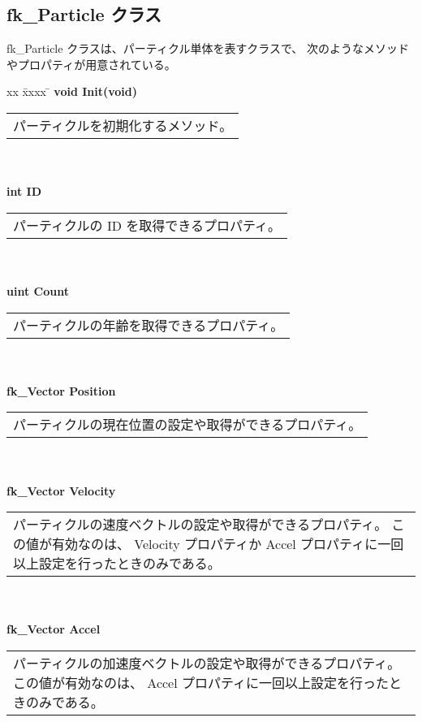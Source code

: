 \subsection{fk\_Particle クラス}
fk\_Particle クラスは、パーティクル単体を表すクラスで、
次のようなメソッドやプロパティが用意されている。
\begin{tabbing}
xx \= xxxx \= \kill
\> \textbf{void Init(void)} \\
	\> \> \begin{tabular}{p{15cm}}
		パーティクルを初期化するメソッド。
	\end{tabular} \\ \\

\> \textbf{int ID} \\
	\> \> \begin{tabular}{p{15cm}}
		パーティクルの ID を取得できるプロパティ。
	\end{tabular} \\ \\

\> \textbf{uint Count} \\
	\> \> \begin{tabular}{p{15cm}}
		パーティクルの年齢を取得できるプロパティ。
	\end{tabular} \\ \\

\> \textbf{fk\_Vector Position} \\
	\> \> \begin{tabular}{p{15cm}}
		パーティクルの現在位置の設定や取得ができるプロパティ。
	\end{tabular} \\ \\

\> \textbf{fk\_Vector Velocity} \\
	\> \> \begin{tabular}{p{15cm}}
		パーティクルの速度ベクトルの設定や取得ができるプロパティ。
		この値が有効なのは、
		Velocity プロパティか Accel プロパティに一回以上設定を行ったときのみである。
	\end{tabular} \\ \\

\> \textbf{fk\_Vector Accel} \\
	\> \> \begin{tabular}{p{15cm}}
		パーティクルの加速度ベクトルの設定や取得ができるプロパティ。
		この値が有効なのは、
		Accel プロパティに一回以上設定を行ったときのみである。
	\end{tabular} \\ \\


\end{tabbing}
